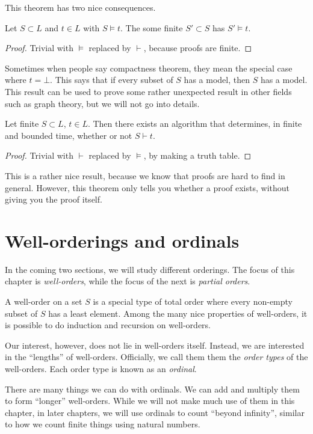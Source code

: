 \documentclass[a4paper]{article}
\begin{document}
This theorem has two nice consequences.
\begin{cor}
  Let $S\subset L$ and $t\in L$ with $S\models t$. The some finite $S'\subset S$ has $S'\models t$.
\end{cor}

\begin{proof}
  Trivial with $\models$ replaced by $\vdash$, because proofs are finite.
\end{proof}
Sometimes when people say compactness theorem, they mean the special case where $t = \bot$. This says that if every subset of $S$ has a model, then $S$ has a model. This result can be used to prove some rather unexpected result in other fields such as graph theory, but we will not go into details.

\begin{cor}
  Let finite $S\subset L$, $t\in L$. Then there exists an algorithm that determines, in finite and bounded time, whether or not $S\vdash t$.
\end{cor}
\begin{proof}
  Trivial with $\vdash$ replaced by $\models$, by making a truth table.
\end{proof}
This is a rather nice result, because we know that proofs are hard to find in general. However, this theorem only tells you whether a proof exists, without giving you the proof itself.

\section{Well-orderings and ordinals}
In the coming two sections, we will study different orderings. The focus of this chapter is \emph{well-orders}, while the focus of the next is \emph{partial orders}.

A well-order on a set $S$ is a special type of total order where every non-empty subset of $S$ has a least element. Among the many nice properties of well-orders, it is possible to do induction and recursion on well-orders.

Our interest, however, does not lie in well-orders itself. Instead, we are interested in the ``lengths'' of well-orders. Officially, we call them them the \emph{order types} of the well-orders. Each order type is known as an \emph{ordinal}.

There are many things we can do with ordinals. We can add and multiply them to form ``longer'' well-orders. While we will not make much use of them in this chapter, in later chapters, we will use ordinals to count ``beyond infinity'', similar to how we count finite things using natural numbers.
\end{document}
